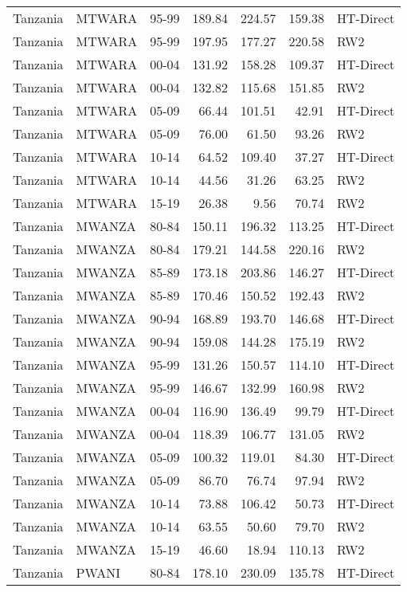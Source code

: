 \begin{longtable}{lllrrrl}
  Tanzania & MTWARA & 95-99 & 189.84 & 224.57 & 159.38 & HT-Direct \\ 
  Tanzania & MTWARA & 95-99 & 197.95 & 177.27 & 220.58 & RW2 \\ 
  Tanzania & MTWARA & 00-04 & 131.92 & 158.28 & 109.37 & HT-Direct \\ 
  Tanzania & MTWARA & 00-04 & 132.82 & 115.68 & 151.85 & RW2 \\ 
  Tanzania & MTWARA & 05-09 & 66.44 & 101.51 & 42.91 & HT-Direct \\ 
  Tanzania & MTWARA & 05-09 & 76.00 & 61.50 & 93.26 & RW2 \\ 
  Tanzania & MTWARA & 10-14 & 64.52 & 109.40 & 37.27 & HT-Direct \\ 
  Tanzania & MTWARA & 10-14 & 44.56 & 31.26 & 63.25 & RW2 \\ 
  Tanzania & MTWARA & 15-19 & 26.38 & 9.56 & 70.74 & RW2 \\ 
  Tanzania & MWANZA & 80-84 & 150.11 & 196.32 & 113.25 & HT-Direct \\ 
  Tanzania & MWANZA & 80-84 & 179.21 & 144.58 & 220.16 & RW2 \\ 
  Tanzania & MWANZA & 85-89 & 173.18 & 203.86 & 146.27 & HT-Direct \\ 
  Tanzania & MWANZA & 85-89 & 170.46 & 150.52 & 192.43 & RW2 \\ 
  Tanzania & MWANZA & 90-94 & 168.89 & 193.70 & 146.68 & HT-Direct \\ 
  Tanzania & MWANZA & 90-94 & 159.08 & 144.28 & 175.19 & RW2 \\ 
  Tanzania & MWANZA & 95-99 & 131.26 & 150.57 & 114.10 & HT-Direct \\ 
  Tanzania & MWANZA & 95-99 & 146.67 & 132.99 & 160.98 & RW2 \\ 
  Tanzania & MWANZA & 00-04 & 116.90 & 136.49 & 99.79 & HT-Direct \\ 
  Tanzania & MWANZA & 00-04 & 118.39 & 106.77 & 131.05 & RW2 \\ 
  Tanzania & MWANZA & 05-09 & 100.32 & 119.01 & 84.30 & HT-Direct \\ 
  Tanzania & MWANZA & 05-09 & 86.70 & 76.74 & 97.94 & RW2 \\ 
  Tanzania & MWANZA & 10-14 & 73.88 & 106.42 & 50.73 & HT-Direct \\ 
  Tanzania & MWANZA & 10-14 & 63.55 & 50.60 & 79.70 & RW2 \\ 
  Tanzania & MWANZA & 15-19 & 46.60 & 18.94 & 110.13 & RW2 \\ 
  Tanzania & PWANI & 80-84 & 178.10 & 230.09 & 135.78 & HT-Direct \\ 

\end{longtable}
